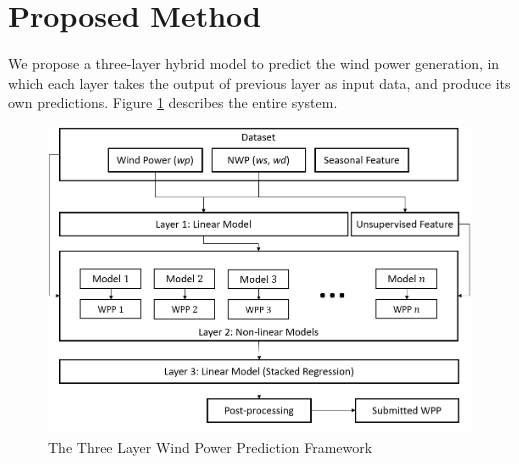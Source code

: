 \documentclass[conference]{IEEEtran}
\begin{document}
\section{Proposed Method}

We propose a three-layer hybrid model to predict the wind power generation, in which each layer takes the output of previous layer as input data, and produce its own predictions. %
Figure \ref{fig:flowchart} describes the entire system. %
\begin{figure}[b]
\centering
\vspace*{-5mm}
\includegraphics[width=0.9\columnwidth]{FIG/flowchart}
\caption{The Three Layer Wind Power Prediction Framework}
\label{fig:flowchart}
\end{figure}
\end{document}
